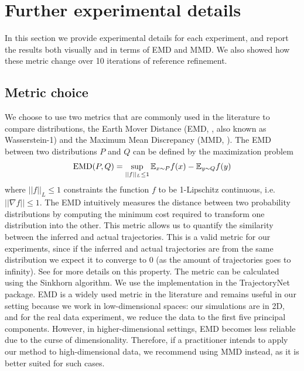 










\clearpage

\section{Further experimental details}
\label{app:further-experiments}
In this section we provide experimental details for each experiment, and report the results both visually and in terms of EMD and MMD.  We also showed how these metric change over 10 iterations of reference refinement. 

\subsection{Metric choice}
\label{app:metrics}
We choose to use two metrics that are commonly used in the literature to compare distributions, the Earth Mover Distance (EMD, \citet{rubner1998metric}, also known as Wasserstein-1) and the Maximum Mean Discrepancy (MMD, \citet{gretton2012kernel}). The EMD between two distributions $P$ and $Q$ can be defined by the maximization problem 
\begin{equation}
    \mathrm{EMD}(P,Q) = \sup_{||f||_L\le 1} \mathbb{E}_{x\sim P}f(x)-\mathbb{E}_{y\sim Q}f(y)
\end{equation} 
where $||f||_L\le 1$ constraints the function $f$ to be 1-Lipschitz continuous, i.e. $||\nabla f||\le 1$. The EMD intuitively measures the distance between two probability distributions by computing the minimum cost required to transform one distribution into the other. This metric allows us to quantify the similarity between the inferred and actual trajectories. This is a valid metric for our experiments, since if the inferred and actual trajectories are from the same distribution we expect it to converge to 0 (as the amount of trajectories goes to infinity). See \citet{fournier2015rate} for more details on this property. The metric can be calculated using the Sinkhorn algorithm. We use the implementation in the TrajectoryNet package. EMD is a widely used metric in the literature and remains useful in our setting because we work in low-dimensional spaces: our simulations are in 2D, and for the real data experiment, we reduce the data to the first five principal components. However, in higher-dimensional settings, EMD becomes less reliable due to the curse of dimensionality. Therefore, if a practitioner intends to apply our method to high-dimensional data, we recommend using MMD instead, as it is better suited for such cases.

